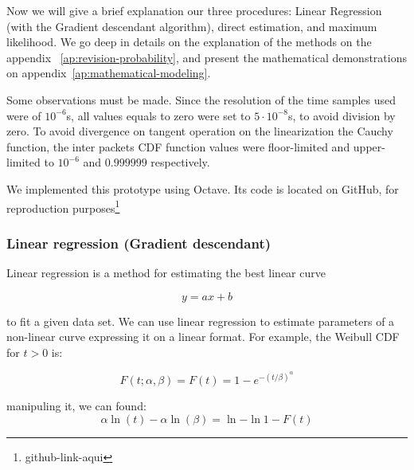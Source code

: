 

Now we will give a brief explanation our three procedures: Linear Regression (with the  Gradient descendant algorithm), direct estimation, and maximum likelihood. We go deep in details on the explanation of the methods on the appendix ~\ref{ap:revision-probability}, and present the mathematical demonstrations on appendix~\ref{ap:mathematical-modeling}. 

Some observations must be made. Since the resolution of the time samples used were of $10^{-6}$s, all values equals to zero were set to  $5\cdot10^{-8}$s, to avoid division by zero. To avoid divergence on tangent operation on the linearization the Cauchy function, the inter packets CDF function values were floor-limited and upper-limited to  $10^{-6}$ and $0.999999$ respectively.

We implemented this prototype using Octave. Its code is located on GitHub, for reproduction purposes\footnote{github-link-aqui}


\subsubsection{Linear regression (Gradient descendant)}

Linear regression is a method for estimating the best linear curve

\begin{equation}
y = ax + b
\end{equation}

to fit a given data set. We can use linear regression to estimate parameters of a non-linear curve expressing it on a linear format. For example, the Weibull CDF for $t > 0$ is:

\begin{equation}
F(t; \alpha, \beta) = F(t) = 1 - e^{-(t/\beta)^{\alpha}}
\end{equation}

manipuling it, we can found:
\begin{equation}
\alpha\ln{(t)} - \alpha\ln{(\beta)} = \ln{-\ln{1 - F(t)}}
\end{equation}

